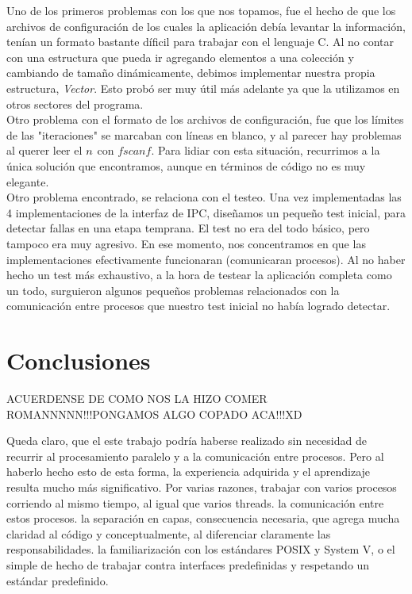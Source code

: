 \documentclass[a4paper,10pt]{article}
\begin{document}
Uno de los primeros problemas con los que nos topamos, fue el hecho de que los archivos de configuración de los cuales la aplicación debía levantar la información, tenían un formato
bastante díficil para trabajar con el lenguaje C. Al no contar con una estructura que pueda ir agregando elementos a una colección y cambiando de tamaño dinámicamente, debimos 
implementar nuestra propia estructura, \textit{Vector}. Esto probó ser muy útil más adelante ya que la utilizamos en otros sectores del programa.\\

Otro problema con el formato de los archivos de configuración, fue que los límites de las "iteraciones" se marcaban con líneas en blanco, y al parecer hay problemas al querer leer el 
$\\n$ con $fscanf$. Para lidiar con esta situación, recurrimos a la única solución que encontramos, aunque en términos de código no es muy elegante.\\

Otro problema encontrado, se relaciona con el testeo. Una vez implementadas las 4 implementaciones de la interfaz de IPC, diseñamos un pequeño test inicial, para detectar fallas en una 
etapa temprana. El test no era del todo básico, pero tampoco era muy agresivo. En ese momento, nos concentramos en que las implementaciones efectivamente funcionaran (comunicaran
 procesos). Al no haber hecho un test más exhaustivo, a la hora de testear la aplicación completa como un todo, surguieron algunos pequeños problemas relacionados con la 
 comunicación entre procesos que nuestro test inicial no había logrado detectar.\\

\newpage
\section{Conclusiones}
ACUERDENSE DE COMO NOS LA HIZO COMER ROMANNNNN!!!PONGAMOS ALGO COPADO ACA!!!XD

Queda claro, que el este trabajo podría haberse realizado sin necesidad de recurrir al procesamiento paralelo y a la comunicación entre procesos. Pero al haberlo hecho esto de esta forma,
la experiencia adquirida y el aprendizaje resulta mucho más significativo. Por varias razones,
trabajar con varios procesos corriendo al mismo tiempo, al igual que varios threads.
la comunicación entre estos procesos.
la separación en capas, consecuencia necesaria, que agrega mucha claridad al código y conceptualmente, al diferenciar claramente las responsabilidades.
la familiarización con los estándares POSIX y System V, o el simple de hecho de trabajar contra interfaces predefinidas y respetando un estándar predefinido.
\end{document}
